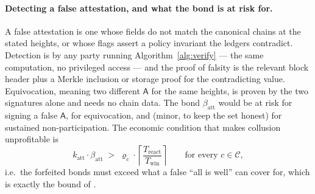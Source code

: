 \paragraph{Detecting a false attestation, and what the bond is at risk for.} A false attestation is
one whose fields do not match the canonical chains at the stated heights, or whose flags assert a
policy invariant the ledgers contradict. Detection is by any party running Algorithm~\ref{alg:verify}
--- the same computation, no privileged access --- and the proof of falsity is the relevant block
header plus a Merkle inclusion or storage proof for the contradicting value. Equivocation, meaning
two different $\mathsf{A}$ for the same heights, is proven by the two signatures alone and needs no
chain data. The bond $\beta_{\mathrm{att}}$ would be at risk for signing a false $\mathsf{A}$, for
equivocation, and (minor, to keep the set honest) for sustained non-participation. The economic
condition that makes collusion unprofitable is
\begin{equation}
\label{eq:bond-condition}
k_{\mathrm{att}} \cdot \beta_{\mathrm{att}} \;>\; \varrho_c \cdot
\left\lceil \frac{T_{\mathrm{react}}}{T_{\mathrm{win}}} \right\rceil
\qquad \text{for every } c \in \mathcal{C},
\end{equation}
i.e.\ the forfeited bonds must exceed what a false ``all is well'' can cover for, which is exactly
the bound of .

